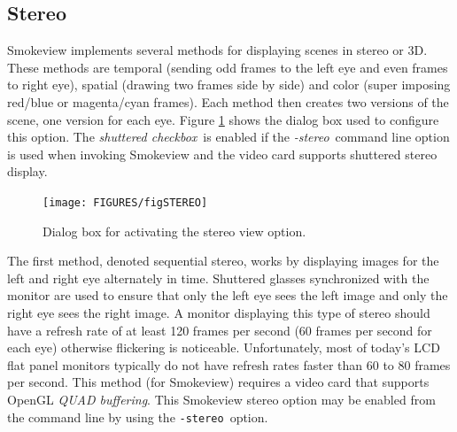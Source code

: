 \documentclass[11pt,twoside]{book}
\begin{document}
\subsection{Stereo}
\label{section:stereo} Smokeview implements several methods for displaying scenes in stereo or 3D. These methods are temporal (sending odd frames to the left eye and even frames to right eye), spatial (drawing two frames side by side) and color (super imposing red/blue or magenta/cyan frames).  Each method then creates two versions of the scene, one version for each eye. Figure \ref{figstereodialog} shows the dialog box used to configure this option.  The {\em shuttered checkbox}\ is enabled if the {\em -stereo}\ command line
option is used when invoking Smokeview and the video card supports shuttered stereo display.

\begin{figure}[\figoptions]
\begin{center}
\texttt{[image: FIGURES/figSTEREO]}
\caption{Dialog box for activating the stereo view option.}
\label{figstereodialog}
\end{center}
\end{figure}

The first method, denoted sequential stereo, works by displaying
images for the left and right eye alternately in time.  Shuttered
glasses  synchronized with the monitor are used to ensure that
only the left eye sees the left image and only the right eye sees
the right image.  A monitor displaying this type of stereo should
have a refresh rate of at least 120 frames per second (60 frames
per second for each eye) otherwise flickering is noticeable.
Unfortunately, most of today's LCD flat panel monitors typically
do not have refresh rates faster than 60 to 80 frames per second.
This method (for Smokeview) requires a video card that supports
OpenGL {\em QUAD buffering}. This Smokeview stereo option may be
enabled from the command line by using the {\tt -stereo}\ option.
\end{document}
